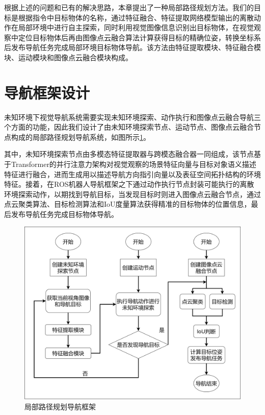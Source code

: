 根据上述的问题和已有的解决思路，本章提出了一种局部路径规划方法。我们的目标是根据指令中目标物体的名称，通过特征融合、特征提取网络模型输出的离散动作在局部环境中进行自主探索，同时利用视觉图像信息识别出目标物体，在视觉观察中定位目标物体后再由图像点云融合算法计算获得目标的精确位姿，转换坐标系后发布导航任务完成局部环境目标物体导航。该方法由特征提取模块、特征融合模块、运动模块和图像点云融合模块构成。


\section{导航框架设计}
未知环境下视觉导航系统需要实现未知环境探索、动作执行和图像点云融合导航三个方面的功能，因此我们设计了由未知环境探索节点、运动节点、图像点云融合节点构成的局部路径规划导航系统，如图所示\ref{局部路径规划导航方法}。

其中，未知环境探索节点由多模态特征提取器与跨模态融合器一同组成，该节点基于Transformer的并行注意力架构对视觉观察的场景特征向量与目标对象语义描述特征进行融合，进而生成用以描述导航方向指引向量以及表征空间拓扑结构的环境特征。接着，在ROS机器人导航框架之下通过动作执行节点封装可能执行的离散环境探索动作，以期找到导航目标，当发现目标时则进入图像点云融合节点，通过点云聚类算法、目标检测算法和IoU度量算法获得精准的目标物体的位置信息，最后发布导航任务完成目标物体导航。
\begin{figure}[htbp]
    \centering
    \includegraphics[scale=0.08]{Fig/未知环境导航框架.png}
    \caption{\label{局部路径规划导航方法}局部路径规划导航框架}
\end{figure}

